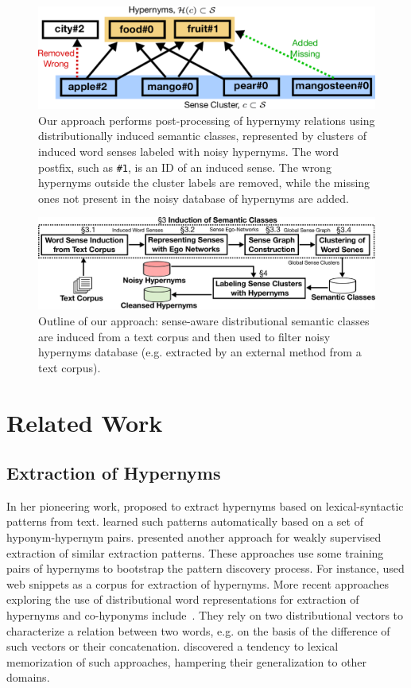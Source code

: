 \documentclass[10pt, a4paper]{article}
\begin{document}
\begin{figure}[ht]
  \centering
  \includegraphics[width=.45\textwidth]{figures/coset}
  \caption{Our approach performs post-processing of hypernymy relations using distributionally induced semantic classes, represented by clusters of induced word senses labeled with noisy hypernyms. The word postfix, such as \texttt{\#1}, is an ID of an induced sense. The wrong hypernyms outside the cluster labels are removed, while the missing ones not present in the noisy database of hypernyms are added. }
  \label{fig:cosetbinary}
\end{figure}


\begin{figure}[ht]
  \centering
  \includegraphics[width=.89\textwidth]{figures/outline}
  \caption{Outline of our approach: sense-aware distributional semantic classes are induced from a text corpus  and then used to filter noisy hypernyms database (e.g. extracted by an external method from a text corpus). }
  \label{fig:outline}
\end{figure}

\section{Related Work}
\label{sec:related}

\subsection{Extraction of Hypernyms}

In her pioneering work,  proposed to extract hypernyms based on lexical-syntactic patterns from text.  learned such patterns automatically based on a set of hyponym-hypernym pairs.  presented another approach for weakly supervised extraction of similar extraction patterns. These approaches use some training pairs of hypernyms to bootstrap the pattern discovery process. For instance,  used web snippets as a corpus for extraction of hypernyms. More recent approaches exploring the use of distributional word representations for extraction of hypernyms and co-hyponyms include~\cite{roller2014inclusive,weeds2014learning,necsulescu2015reading,vylomova-EtAl:2016:P16-1}. They rely on two distributional vectors to characterize a relation between two words, e.g. on the basis of the difference of such vectors or their concatenation.  discovered a tendency to lexical memorization of such approaches, hampering their generalization to other domains.
\end{document}
